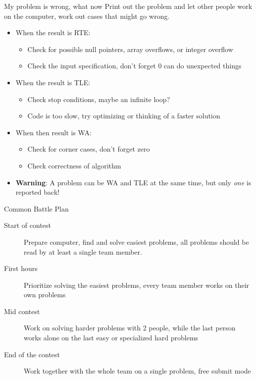 \documentclass[11pt,pdf, aspectratio=169]{beamer}
\begin{document}
  \begin{frame}{My problem is wrong, what now}
    Print out the problem and let other people work on the computer, work out cases that might go wrong.
    \begin{itemize}
      \item When the result is RTE:
      \begin{itemize}
        \item Check for possible null pointers, array overflows, or integer overflow
        \item Check the input specification, don't forget 0 can do unexpected things
      \end{itemize}
      \item When the result is TLE:
      \begin{itemize}
        \item Check stop conditions, maybe an infinite loop?
        \item Code is too slow, try optimizing or thinking of a faster solution
      \end{itemize}
      \item When then result is WA:
      \begin{itemize}
        \item Check for corner cases, don't forget zero
        \item Check correctness of algorithm
      \end{itemize}
      \item \textbf{Warning}: A problem can be WA and TLE at the same time, but only \emph{one} is reported back!
    \end{itemize}
  \end{frame}
  \begin{frame}{Common Battle Plan}
    \begin{description}
      \item [Start of contest] Prepare computer, find and solve easiest problems, all problems should be read by at least a single team member.
      \item[First hours] Prioritize solving the easiest problems, every team member works on their own problems
      \item[Mid contest] Work on solving harder problems with 2 people, while the last person works alone on the last easy or specialized hard problems
      \item[End of the contest] Work together with the whole team on a single problem, free submit mode
    \end{description}
  \end{frame}
\end{document}
